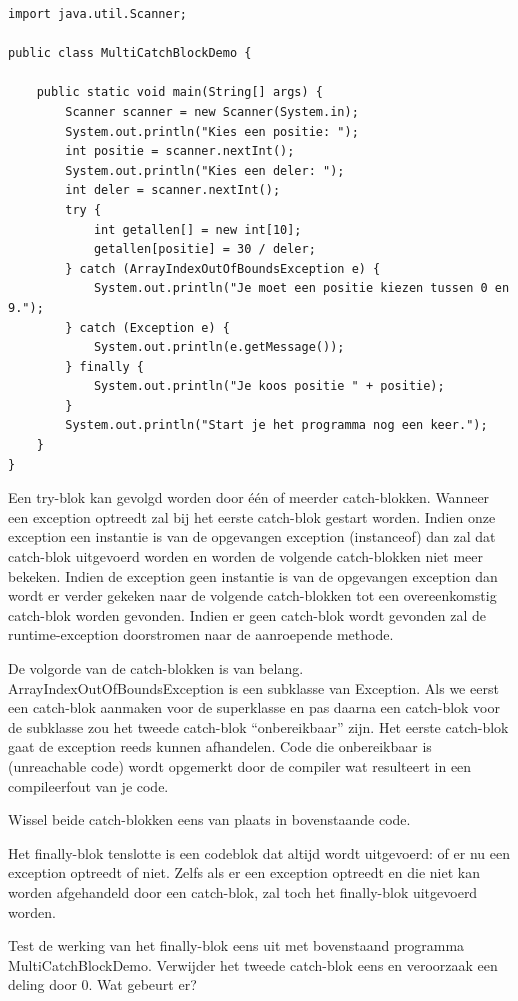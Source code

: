 \begin{lstlisting}
import java.util.Scanner;

public class MultiCatchBlockDemo {

	public static void main(String[] args) {
		Scanner scanner = new Scanner(System.in);
		System.out.println("Kies een positie: ");
		int positie = scanner.nextInt();
		System.out.println("Kies een deler: ");
		int deler = scanner.nextInt();
		try {
			int getallen[] = new int[10];
			getallen[positie] = 30 / deler;
		} catch (ArrayIndexOutOfBoundsException e) {
			System.out.println("Je moet een positie kiezen tussen 0 en 9.");
		} catch (Exception e) {
			System.out.println(e.getMessage());
		} finally {
			System.out.println("Je koos positie " + positie);
		}
		System.out.println("Start je het programma nog een keer.");
	}
}
\end{lstlisting}

Een try-blok kan gevolgd worden door \'e\'en of meerder catch-blokken.
Wanneer een exception optreedt zal bij het eerste catch-blok gestart worden. Indien onze exception een instantie is van de opgevangen exception  (instanceof) dan zal dat catch-blok uitgevoerd worden en worden de volgende catch-blokken niet meer bekeken. Indien de exception geen instantie is van de opgevangen exception dan wordt er verder gekeken naar de volgende catch-blokken tot een overeenkomstig catch-blok worden gevonden. Indien er geen catch-blok wordt gevonden zal de runtime-exception doorstromen naar de aanroepende methode.

De volgorde van de catch-blokken is van belang. ArrayIndexOutOfBoundsException is een subklasse van Exception. Als we eerst een catch-blok aanmaken voor de superklasse en pas daarna een catch-blok voor de subklasse zou het tweede catch-blok ``onbereikbaar'' zijn. Het eerste catch-blok gaat de exception reeds kunnen afhandelen. Code die onbereikbaar is (unreachable code) wordt opgemerkt door de compiler wat resulteert in een compileerfout van je code.

\begin{oefening}
Wissel beide catch-blokken eens van plaats in bovenstaande code.
\end{oefening}

Het finally-blok tenslotte is een codeblok dat altijd wordt uitgevoerd: of er nu een exception optreedt of niet. Zelfs als er een exception optreedt en die niet kan worden afgehandeld door een catch-blok, zal toch het finally-blok uitgevoerd worden.

\begin{oefening}
Test de werking van het finally-blok eens uit met bovenstaand programma MultiCatchBlockDemo. Verwijder het tweede catch-blok eens en veroorzaak een deling door 0. Wat gebeurt er?
\end{oefening}

